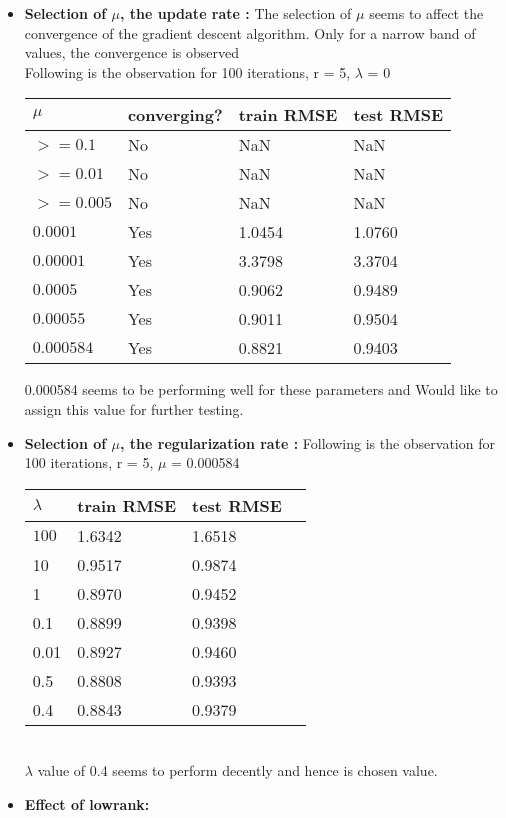 \documentclass[twoside,10pt]{article}
\begin{document}
\begin{itemize}
	\item  \textbf{Selection of $\mu$, the update rate :} 
    	The selection of $\mu$ seems to affect the convergence of the gradient descent algorithm. Only for a narrow band of values, the convergence is observed\\
   Following is the observation for 100 iterations, r = 5, $\lambda$ = 0\\     
   \begin{tabular}{| l | l | l | l | }
    \hline
     $\mu$ & converging?  & train RMSE & test RMSE  \\ \hline
     $>=0.1$ & No & NaN & NaN \\ \hline
     $>=0.01$ & No & NaN & NaN \\ \hline
     $>=0.005$ & No & NaN & NaN \\ \hline
     $0.0001$ & Yes & 1.0454 & 1.0760 \\ \hline
     $0.00001$ & Yes & 3.3798 & 3.3704 \\ \hline
     $0.0005$ & Yes & 0.9062 & 0.9489 \\ \hline
     $0.00055$ & Yes & 0.9011 & 0.9504 \\ \hline
     $0.000584$ & Yes & 0.8821 & 0.9403 \\ \hline
     
    \hline
    \end{tabular}
    
    0.000584 seems to be performing well for these parameters and Would like to assign this value for further testing.
    \item  \textbf{Selection of $\mu$, the regularization rate :} 
   Following is the observation for 100 iterations, r = 5, $\mu$ = 0.000584\\     
   \begin{tabular}{| l | l | l | l | }
    \hline
     $\lambda$   & train RMSE & test RMSE  \\ \hline
     $100$  & 1.6342 & 1.6518 \\ \hline
     10 & 0.9517 & 0.9874 \\ \hline
     1 & 0.8970 & 0.9452\\ \hline
     0.1 & 0.8899 & 0.9398 \\ \hline
     0.01  & 0.8927 & 0.9460 \\ \hline
     0.5  & 0.8808 & 0.9393 \\ \hline
     0.4 & 0.8843 & 0.9379 \\ \hline
    \end{tabular}\\
    $\lambda$ value of 0.4 seems to perform decently and hence is chosen value.
    \item \textbf{Effect of lowrank:} 
    

\end{itemize}
\end{document}
